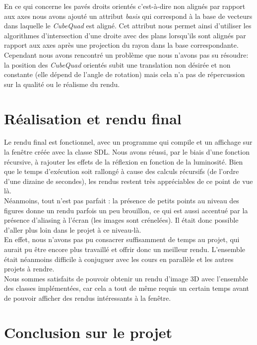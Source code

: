 \documentclass[a4paper,oneside,12pt,titlepage]{article}
\begin{document}
\begin{sloppypar}
En ce qui concerne les pavés droits orientés c'est-à-dire non alignés par rapport aux axes nous avons ajouté un attribut \textit{basis} qui correspond à la base de vecteurs dans laquelle le \textit{CubeQuad} est aligné. Cet attribut nous permet ainsi d'utiliser les algorithmes d'intersection d'une droite avec des plans lorsqu'ils sont alignés par rapport aux axes après une projection du rayon dans la base correspondante. Cependant nous avons rencontré un problème que nous n'avons pas su résoudre: la position des \textit{CubeQuad} orientés subit une translation non désirée et non constante (elle dépend de l'angle de rotation) mais cela n'a pas de répercussion sur la qualité ou le réalisme du rendu.

\newpage

\section{Réalisation et rendu final}

Le rendu final est fonctionnel, avec un programme qui compile et un affichage sur la fenêtre créée avec la classe SDL. Nous avons réussi, par le biais d’une fonction récursive, à rajouter les effets de la réflexion en fonction de la luminosité. Bien que le temps d'exécution soit rallongé à cause des calculs récursifs (de l'ordre d'une dizaine de secondes), les rendus restent très appréciables de ce point de vue là. \\[6pt] 

Néanmoins, tout n’est pas parfait : la présence de petits points au niveau des figures donne un rendu parfois un peu brouillon, ce qui est aussi accentué par la présence d’aliasing à l’écran (les images sont crénelées). Il était donc possible d’aller plus loin dans le projet à ce niveau-là. \\[6pt] 

En effet, nous n'avons pas pu consacrer suffisamment de temps au projet, qui aurait pu être encore plus travaillé et offrir donc un meilleur rendu. L’ensemble était néanmoins difficile à conjuguer avec les cours en parallèle et les autres projets à rendre. \\[6pt] 

Nous sommes satisfaits de pouvoir obtenir un rendu d’image 3D avec l’ensemble des classes implémentées, car cela a tout de même requis un certain temps avant de pouvoir afficher des rendus intéressants à la fenêtre.


\section{Conclusion sur le projet}


\end{sloppypar}
\end{document}
